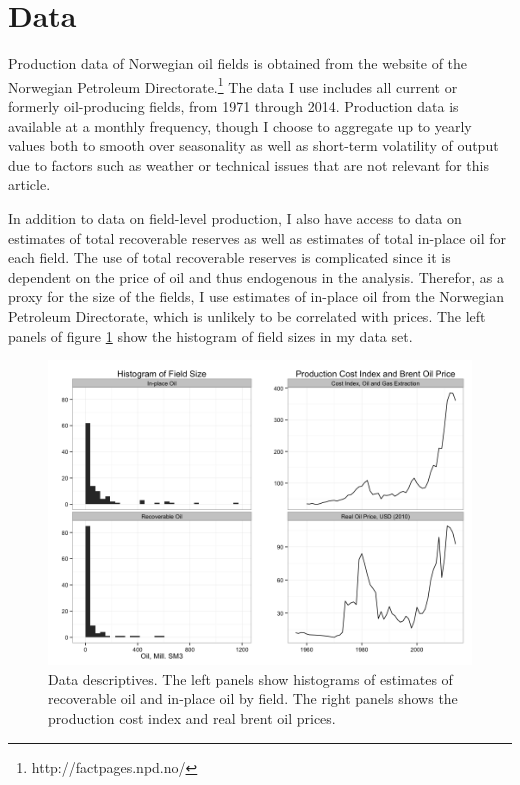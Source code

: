 \documentclass[11pt]{article}
\begin{document}
\section{Data}
Production data of Norwegian oil fields is obtained from the website of the Norwegian Petroleum Directorate.\footnote{http://factpages.npd.no/} The data I use includes all current or formerly oil-producing fields, from 1971 through 2014. Production data is available at a monthly frequency, though I choose to aggregate up to yearly values both to smooth over seasonality as well as short-term volatility of output due to factors such as weather or technical issues that are not relevant for this article. 

In addition to data on field-level production, I also have access to data on estimates of total recoverable reserves as well as estimates of total in-place oil for each field. The use of total recoverable reserves is complicated since it is dependent on the price of oil and thus endogenous in the analysis.  Therefor, as a proxy for the size of the fields, I use estimates of in-place oil from the Norwegian Petroleum Directorate, which is unlikely to be correlated with prices. The left panels of figure \ref{data_descriptives} show the histogram of field sizes in my data set. 

\begin{figure}
	\includegraphics[width=1\textwidth]{figures/data_descriptives.png}
	\caption{Data descriptives. The left panels show histograms of estimates of recoverable oil and in-place oil by field. The right panels shows the production cost index and real brent oil prices.}
	\label{data_descriptives}
\end{figure}
\end{document}
